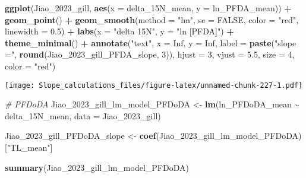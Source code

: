 \documentclass[
]{article}
\newenvironment{Shaded}{\begin{snugshade}}{\end{snugshade}}
\newcommand{\AttributeTok}[1]{\textcolor[rgb]{0.13,0.29,0.53}{#1}}
\newcommand{\CommentTok}[1]{\textcolor[rgb]{0.56,0.35,0.01}{\textit{#1}}}
\newcommand{\ConstantTok}[1]{\textcolor[rgb]{0.56,0.35,0.01}{#1}}
\newcommand{\DecValTok}[1]{\textcolor[rgb]{0.00,0.00,0.81}{#1}}
\newcommand{\FloatTok}[1]{\textcolor[rgb]{0.00,0.00,0.81}{#1}}
\newcommand{\FunctionTok}[1]{\textcolor[rgb]{0.13,0.29,0.53}{\textbf{#1}}}
\newcommand{\NormalTok}[1]{#1}
\newcommand{\OtherTok}[1]{\textcolor[rgb]{0.56,0.35,0.01}{#1}}
\newcommand{\SpecialCharTok}[1]{\textcolor[rgb]{0.81,0.36,0.00}{\textbf{#1}}}
\newcommand{\StringTok}[1]{\textcolor[rgb]{0.31,0.60,0.02}{#1}}
\begin{document}
\begin{Shaded}
\begin{Highlighting}[]
\FunctionTok{ggplot}\NormalTok{(Jiao\_2023\_gill, }\FunctionTok{aes}\NormalTok{(}\AttributeTok{x =}\NormalTok{ delta\_15N\_mean, }\AttributeTok{y =}\NormalTok{ ln\_PFDA\_mean)) }\SpecialCharTok{+}
  \FunctionTok{geom\_point}\NormalTok{() }\SpecialCharTok{+}
  \FunctionTok{geom\_smooth}\NormalTok{(}\AttributeTok{method =} \StringTok{"lm"}\NormalTok{, }\AttributeTok{se =} \ConstantTok{FALSE}\NormalTok{, }\AttributeTok{color =} \StringTok{"red"}\NormalTok{, }\AttributeTok{linewidth =} \FloatTok{0.5}\NormalTok{) }\SpecialCharTok{+}
  \FunctionTok{labs}\NormalTok{(}\AttributeTok{x =} \StringTok{"delta 15N"}\NormalTok{,}
       \AttributeTok{y =} \StringTok{"ln [PFDA]"}\NormalTok{) }\SpecialCharTok{+}
  \FunctionTok{theme\_minimal}\NormalTok{() }\SpecialCharTok{+}
  \FunctionTok{annotate}\NormalTok{(}\StringTok{"text"}\NormalTok{, }\AttributeTok{x =} \ConstantTok{Inf}\NormalTok{, }\AttributeTok{y =} \ConstantTok{Inf}\NormalTok{, }\AttributeTok{label =} \FunctionTok{paste}\NormalTok{(}\StringTok{"slope ="}\NormalTok{, }\FunctionTok{round}\NormalTok{(Jiao\_2023\_gill\_PFDA\_slope, }\DecValTok{3}\NormalTok{)), }
           \AttributeTok{hjust =} \DecValTok{3}\NormalTok{, }\AttributeTok{vjust =} \FloatTok{5.5}\NormalTok{, }\AttributeTok{size =} \DecValTok{4}\NormalTok{, }\AttributeTok{color =} \StringTok{"red"}\NormalTok{)}
\end{Highlighting}
\end{Shaded}

\texttt{[image: Slope\_calculations\_files/figure-latex/unnamed-chunk-227-1.pdf]}

\begin{Shaded}
\begin{Highlighting}[]
\CommentTok{\# PFDoDA}
\NormalTok{Jiao\_2023\_gill\_lm\_model\_PFDoDA }\OtherTok{\textless{}{-}} \FunctionTok{lm}\NormalTok{(ln\_PFDoDA\_mean }\SpecialCharTok{\textasciitilde{}}\NormalTok{ delta\_15N\_mean,}
                                    \AttributeTok{data =}\NormalTok{ Jiao\_2023\_gill)}

\NormalTok{Jiao\_2023\_gill\_PFDoDA\_slope }\OtherTok{\textless{}{-}} \FunctionTok{coef}\NormalTok{(Jiao\_2023\_gill\_lm\_model\_PFDoDA)[}\StringTok{"TL\_mean"}\NormalTok{]}

\FunctionTok{summary}\NormalTok{(Jiao\_2023\_gill\_lm\_model\_PFDoDA)}
\end{Highlighting}
\end{Shaded}
\end{document}
